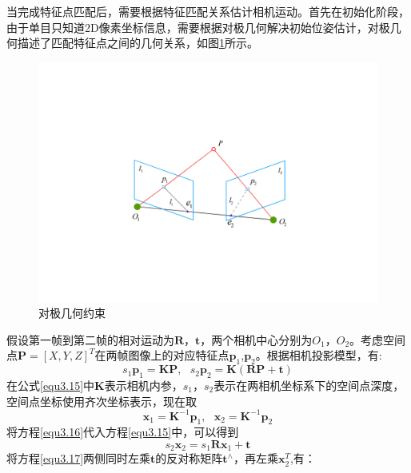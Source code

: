 当完成特征点匹配后，需要根据特征匹配关系估计相机运动。首先在初始化阶段，由于单目只知道2D像素坐标信息，需要根据对极几何解决初始位姿估计，对极几何描述了匹配特征点之间的几何关系，如图\ref{fig3.7}所示。

\begin{figure}[h]
\centering
\includegraphics[scale=0.3,angle=-90]{figures/Fig3-7.pdf}
\caption{对极几何约束}
\label{fig3.7}
\end{figure}
假设第一帧到第二帧的相对运动为$\boldsymbol{R}$，$\boldsymbol{t}$，两个相机中心分别为$O_1$，$O_2$。考虑空间点$\boldsymbol{P}=[X,Y,Z]^T$在两帧图像上的对应特征点$\boldsymbol{p}_1$,$\boldsymbol{p}_2$。根据相机投影模型，有:
\begin{equation}
\label{equ3.15}
s_1 \boldsymbol{p}_1 = \boldsymbol{K} \boldsymbol{P}, \ \ \ 
s_2 \boldsymbol{p}_2 = \boldsymbol{K} (\boldsymbol{R} \boldsymbol{P}+\boldsymbol{t})
\end{equation}
在公式\eqref{equ3.15}中$\boldsymbol{K}$表示相机内参，$s_1$，$s_2$表示在两相机坐标系下的空间点深度，空间点坐标使用齐次坐标表示，现在取
\begin{equation}
\label{equ3.16}
\boldsymbol{x}_1 = \boldsymbol{K}^{-1} \boldsymbol{p}_1, \ \ \ 
\boldsymbol{x}_2 = \boldsymbol{K}^{-1} \boldsymbol{p}_2
\end{equation}
将方程\eqref{equ3.16}代入方程\eqref{equ3.15}中，可以得到
\begin{equation}
\label{equ3.17}
s_2 \boldsymbol{x}_2 = s_1 \boldsymbol{R} \boldsymbol{x}_1 + \boldsymbol{t}
\end{equation}
将方程\eqref{equ3.17}两侧同时左乘$\boldsymbol{t}$的反对称矩阵$\boldsymbol{t}^{\wedge}$，再左乘$\boldsymbol{x}_2^T$,有：
